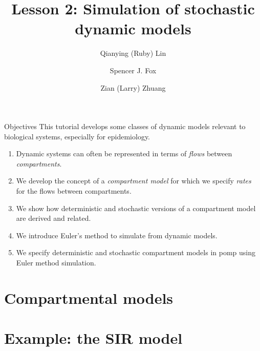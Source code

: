 \documentclass[
  ignorenonframetext,
  aspectratio=169,
  t]{beamer}
\title{Lesson 2: Simulation of stochastic dynamic models}
\author{Qianying (Ruby) Lin \and Spencer J. Fox \and Zian (Larry)
Zhuang}
\date{}
\providecommand{\tightlist}{%
  \setlength{\itemsep}{0pt}\setlength{\parskip}{0pt}}\usepackage{longtable,booktabs,array}
\theoremstyle{definition}
\begin{document}
\frame{\titlepage}

\begin{frame}{Objectives}
\label{objectives}
This tutorial develops some classes of dynamic models relevant to
biological systems, especially for epidemiology.

\begin{enumerate}
\tightlist
\item
  Dynamic systems can often be represented in terms of \emph{flows}
  between \emph{compartments}.
\item
  We develop the concept of a \emph{compartment model} for which we
  specify \emph{rates} for the flows between compartments.
\item
  We show how deterministic and stochastic versions of a compartment
  model are derived and related.
\item
  We introduce Euler's method to simulate from dynamic models.
\item
  We specify deterministic and stochastic compartment models in pomp
  using Euler method simulation.
\end{enumerate}
\end{frame}

\section{Compartmental models}\label{compartmental-models}

\section{Example: the SIR model}\label{example-the-sir-model}
\end{document}
